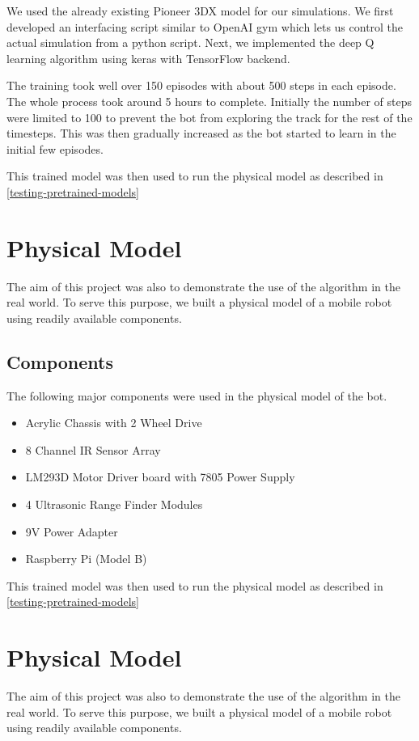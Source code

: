 \documentclass[12pt]{extreport}
\theoremstyle{plain}
\theoremstyle{definition}
\begin{document}
We used the already existing Pioneer 3DX model for our simulations. We first developed an interfacing script similar to OpenAI gym which lets us control the actual simulation from a python script. Next, we implemented the deep Q learning algorithm using keras with TensorFlow backend.

The training took well over 150 episodes with about 500 steps in each episode. The whole process took around 5 hours to complete. Initially the number of steps were limited to 100 to prevent the bot from exploring the track for the rest of the timesteps. This was then gradually increased as the bot started to learn in the initial few episodes.

This trained model was then used to run the physical model as described in \autoref{testing-pretrained-models}

\chapter{Physical Model}
The aim of this project was also to demonstrate the use of the algorithm in the real world. To serve this purpose, we built a physical model of a mobile robot using readily available components.

\section{Components}
The following major components were used in the physical model of the bot.
\begin{itemize}
 \item Acrylic Chassis with 2 Wheel Drive
 \item 8 Channel IR Sensor Array
 \item LM293D Motor Driver board with 7805 Power Supply
 \item 4 Ultrasonic Range Finder Modules
 \item 9V Power Adapter
 \item Raspberry Pi (Model B)
\end{itemize}

This trained model was then used to run the physical model as described in \autoref{testing-pretrained-models}

\chapter{Physical Model}
The aim of this project was also to demonstrate the use of the algorithm in the real world. To serve this purpose, we built a physical model of a mobile robot using readily available components.
\end{document}
